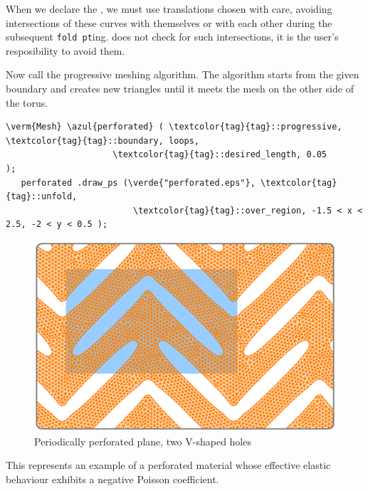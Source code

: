 When we declare the {\small\tt{}}, we must use translations chosen with care,
avoiding intersections of these curves with themselves or with each other during the subsequent
\mbox{{\small\tt fold pt}ing}.
\ManiFEM{} does not check for such intersections, it is the user's resposibility to avoid them.

Now call the progressive meshing algorithm.
The algorithm starts from the given boundary and creates new triangles until
it meets the mesh on the other side of the torus.

\begin{Verbatim}[commandchars=\\\{\},formatcom=\small\tt,frame=single,
   label=code not working,rulecolor=\color{coment},
   baselinestretch=0.94,framesep=2mm                                   ]
   \verm{Mesh} \azul{perforated} ( \textcolor{tag}{tag}::progressive, \textcolor{tag}{tag}::boundary, loops,
                     \textcolor{tag}{tag}::desired_length, 0.05              );
   perforated .draw_ps (\verde{"perforated.eps"}, \textcolor{tag}{tag}::unfold,
                         \textcolor{tag}{tag}::over_region, -1.5 < x < 2.5, -2 < y < 0.5 );
\end{Verbatim}

\begin{figure}[ht] \centering
  \includegraphics[width=130mm]{boomerang-3.eps}
  \caption{Periodically perforated plane, two V-shaped holes}
  \label{\numb section 7.\numb fig 16}
\end{figure}

This represents an example of a perforated material whose effective elastic behaviour
exhibits a negative Poisson coefficient.
